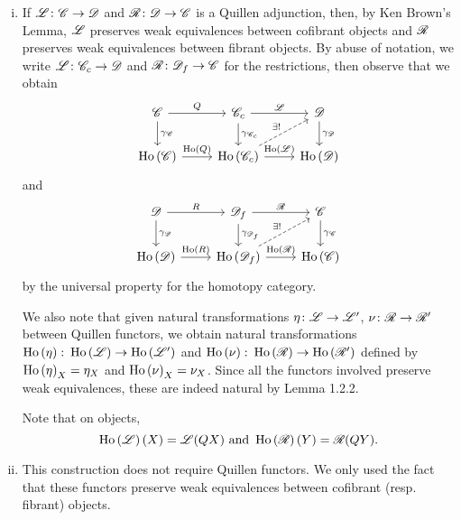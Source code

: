 \documentclass[10pt]{amsart}
\begin{document}

\begin{rmk}
  \begin{enumerate}[(i)]
  \item
    If $\mathscr{L} \colon \mathscr{C} \to \mathscr{D}$ and $\mathscr{R} \colon \mathscr{D} \to \mathscr{C}$ is a Quillen adjunction, then, by Ken Brown's Lemma, $\mathscr{L}$ preserves weak equivalences between cofibrant objects and $\mathscr{R}$ preserves weak equivalences between fibrant objects.
    By abuse of notation, we write $\mathscr{L} \colon \mathscr{C}_c \to \mathscr{D}$ and $\mathscr{R} \colon \mathscr{D}_f \to \mathscr{C}$ for the restrictions, then observe that we obtain
    $$\begin{tikzcd}
      \C \arrow{r}{Q}\arrow{d}{\gamma_{\C}} & \C_c \arrow{r}{\LA}\arrow{d}{\gamma_{\C_c}} & \D \arrow{d}{\gamma_\D}\\
      \Ho{\C} \arrow{r}{\Ho{Q}} & \Ho{\C_c} \arrow[dashed]{ur}{\exists !}\arrow{r}{\Ho{\LA}} & \Ho{\D}
    \end{tikzcd}$$
    and
    $$\begin{tikzcd}
      \D \arrow{r}{R}\arrow{d}{\gamma_{\D}} & \D_f \arrow{r}{\RA}\arrow{d}{\gamma_{\D_f}} & \C \arrow{d}{\gamma_\C}\\
      \Ho{\D} \arrow{r}{\Ho{R}} & \Ho{\D_f} \arrow[dashed]{ur}{\exists !}\arrow{r}{\Ho{\RA}} & \Ho{\C}
    \end{tikzcd}$$
    by the universal property for the homotopy category.

    We also note that given natural transformations $\eta \colon \mathscr{L} \to \mathscr{L}^\prime$, $\nu \colon \mathscr{R} \to \mathscr{R}^\prime$ between Quillen functors, we obtain natural transformations $\operatorname{Ho}\left(\eta\right) \colon \operatorname{Ho}\left(\mathscr{L}\right) \to \operatorname{Ho}\left(\mathscr{L}^\prime\right)$ and $\operatorname{Ho}\left(\nu\right) \colon \operatorname{Ho}\left(\mathscr{R}\right) \to \operatorname{Ho}\left(\mathscr{R}^\prime\right)$ defined by $\operatorname{Ho}\left(\eta\right)_X = \eta_X$ and $\operatorname{Ho}\left(\nu\right)_X = \nu_X$.
    Since all the functors involved preserve weak equivalences, these are indeed natural by Lemma 1.2.2.
    
    Note that on objects, 
    $$\operatorname{Ho}\left(\mathscr{L}\right)(X) = \mathscr{L}(QX)\ \text{and}\ \operatorname{Ho}\left(\mathscr{R}\right)(Y) = \mathscr{R}(QY).$$ 
  \item
    This construction does not require Quillen functors.
    We only used the fact that these functors preserve weak equivalences between cofibrant (resp. fibrant) objects.
  \end{enumerate}
\end{rmk}
\end{document}
